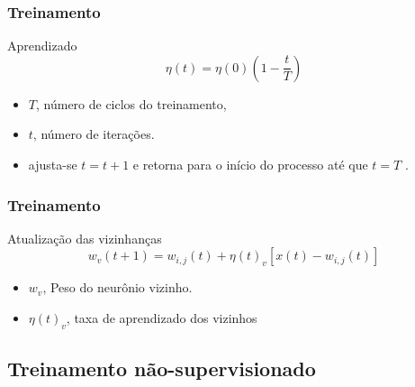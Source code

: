 \documentclass[aspectratio=10]{beamer} %
\begin{document}
\begin{frame}
\frametitle{Treinamento}
\begin{block}{Aprendizado}
\begin{equation}
\eta(t)=\eta(0)    ( 1 -  \frac{t}{T}  )  \nonumber
\label{aprendizado}
\end{equation}
\end{block}
\begin{itemize}
\pause
\item $T$, número de ciclos do treinamento,
\pause
\item $t$, número de iterações.
\pause
\item ajusta-se $t=t+1$ e retorna para o início do processo até que $t=T$ \citep{YANG2009,Yan2014}.
\end{itemize}
\end{frame}

\begin{frame}
\frametitle{Treinamento}
\begin{block}{Atualização das vizinhanças}
\begin{equation}
w_{v}(t+1)=w_{i,j}(t)+\eta(t)_{v}[x(t)-w_{i,j}(t)] \nonumber
\label{ajuste de pesos}
\end{equation}
\end{block}
\begin{itemize}
\pause
\item $w_{v}$, Peso do neurônio vizinho. %
\pause
\item $\eta(t)_{v}$, taxa de aprendizado dos vizinhos%
\pause
\end{itemize}
\end{frame}

\subsection{Treinamento não-supervisionado}
\end{document}
